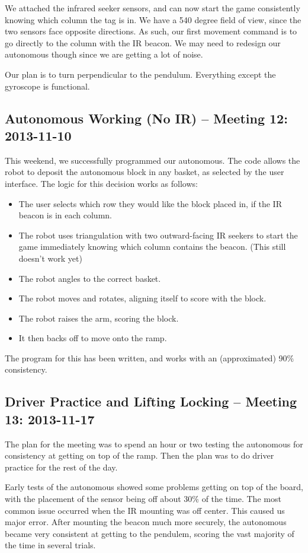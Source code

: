 We attached the infrared seeker sensors, and can now start the game consistently knowing which column the tag is in. We have a 540 degree field of view, since the two sensors face opposite directions. As such, our first movement command is to go directly to the column with the IR beacon. We may need to redesign our autonomous though since we are getting a lot of noise. 

Our plan is to turn perpendicular to the pendulum. Everything except the gyroscope is functional.

\newpage \subsection{Autonomous Working (No IR) -- Meeting 12: 2013-11-10}
This weekend, we successfully programmed our autonomous. The code allows the robot to deposit the autonomous block in any basket, as selected by the user interface. The logic for this decision works as follows:
\begin{itemize}
\item The user selects which row they would like the block placed in, if the IR beacon is in each column.
\item The robot uses triangulation with two outward-facing IR seekers to start the game immediately knowing which column contains the beacon. (This still doesn't work yet)
\item The robot angles to the correct basket.
\item The robot moves and rotates, aligning itself to score with the block.
\item The robot raises the arm, scoring the block.
\item It then backs off to move onto the ramp.
\end{itemize}

The program for this has been written, and works with an (approximated) 90\% consistency.

\newpage \subsection{Driver Practice and Lifting Locking -- Meeting 13: 2013-11-17}
The plan for the meeting was to spend an hour or two testing the autonomous for consistency at getting on top of the ramp. Then the plan was to do driver practice for the rest of the day.

Early tests of the autonomous showed some problems getting on top of the board, with the placement of the sensor being off about 30\% of the time. The most common issue occurred when the IR mounting was off center. This caused us major error. After mounting the beacon much more securely, the autonomous became very consistent at getting to the pendulem, scoring the vast majority of the time in several trials.

